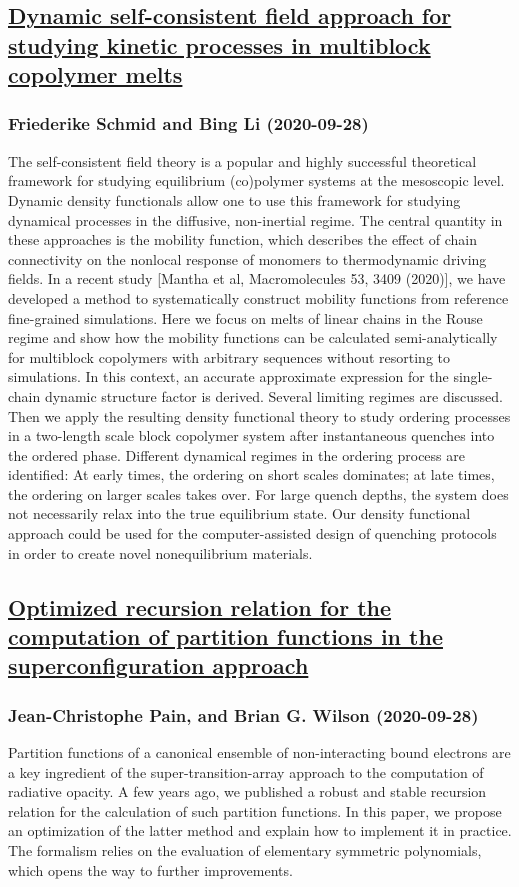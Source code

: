 \subsection*{\href{http://arxiv.org/abs/2009.13244v1}{Dynamic self-consistent field approach for studying kinetic processes in  multiblock copolymer melts}}
\subsubsection*{Friederike Schmid and Bing Li (2020-09-28)}
The self-consistent field theory is a popular and highly successful
theoretical framework for studying equilibrium (co)polymer systems at the
mesoscopic level. Dynamic density functionals allow one to use this framework
for studying dynamical processes in the diffusive, non-inertial regime. The
central quantity in these approaches is the mobility function, which describes
the effect of chain connectivity on the nonlocal response of monomers to
thermodynamic driving fields. In a recent study [Mantha et al, Macromolecules
53, 3409 (2020)], we have developed a method to systematically construct
mobility functions from reference fine-grained simulations. Here we focus on
melts of linear chains in the Rouse regime and show how the mobility functions
can be calculated semi-analytically for multiblock copolymers with arbitrary
sequences without resorting to simulations. In this context, an accurate
approximate expression for the single-chain dynamic structure factor is
derived. Several limiting regimes are discussed. Then we apply the resulting
density functional theory to study ordering processes in a two-length scale
block copolymer system after instantaneous quenches into the ordered phase.
Different dynamical regimes in the ordering process are identified: At early
times, the ordering on short scales dominates; at late times, the ordering on
larger scales takes over. For large quench depths, the system does not
necessarily relax into the true equilibrium state. Our density functional
approach could be used for the computer-assisted design of quenching protocols
in order to create novel nonequilibrium materials.

\subsection*{\href{http://arxiv.org/abs/2009.13518v1}{Optimized recursion relation for the computation of partition functions  in the superconfiguration approach}}
\subsubsection*{Jean-Christophe Pain, and Brian G. Wilson (2020-09-28)}
Partition functions of a canonical ensemble of non-interacting bound
electrons are a key ingredient of the super-transition-array approach to the
computation of radiative opacity. A few years ago, we published a robust and
stable recursion relation for the calculation of such partition functions. In
this paper, we propose an optimization of the latter method and explain how to
implement it in practice. The formalism relies on the evaluation of elementary
symmetric polynomials, which opens the way to further improvements.

